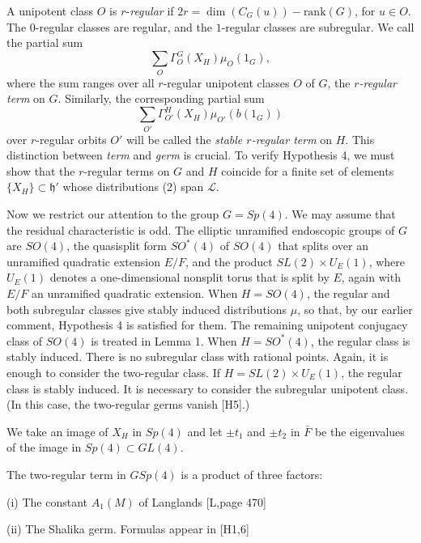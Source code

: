 \documentclass{amsart}
\newcommand\cL{{\mathcal L}}
\newcommand\h{{\mathfrak h}}
\begin{document}
A unipotent class $O$ is $r$-{\it regular} if $2r=\dim(C_G(u))-
\text{rank}(G)$, for $u\in O$.  The $0$-regular classes are 
regular, and the $1$-regular classes are subregular.
We call the partial sum 
$$\sum_O\Gamma_O^G(X_H)\mu_O(1_G),$$ where the sum ranges
over all $r$-regular unipotent classes $O$ of $G$, the
{\it $r$-regular term\/} on $G$.  Similarly, the corresponding partial
sum
$$\sum_{O'}\Gamma_{O'}^H(X_H)\mu_{O'}(b(1_G))$$
over $r$-regular orbits $O'$ will be called the
{\it stable $r$-regular term\/} on $H$.  This
distinction between {\it term\/} and {\it germ\/} is
crucial. To verify Hypothesis
4, we must show that the $r$-regular terms on $G$ and $H$
coincide for a finite set of elements $\{X_H\}\subset \h'$ whose
distributions (2) span $\cL$.

\bigskip

Now we restrict our attention to the group $G=Sp(4)$.  
We may assume that the residual characteristic is odd.
The elliptic unramified endoscopic groups
of $G$ are $SO(4)$, the quasisplit form $SO^*(4)$ of $SO(4)$ 
that splits over
an unramified quadratic extension $E/F$, and the product
$SL(2)\times U_E(1)$, where $U_E(1)$ denotes a one-dimensional
nonsplit torus that is split by $E$,
again with $E/F$ an unramified quadratic extension.
When $H=SO(4)$, the regular and both subregular classes give stably
induced distributions $\mu$, so that, by our earlier
comment, Hypothesis 4 is satisfied for
them.  The remaining unipotent conjugacy class of $SO(4)$ is treated
in Lemma 1.  When $H=SO^*(4)$, the regular class is stably
induced. There is no subregular class with
rational points. Again, it is enough to consider the two-regular
class.  If $H=SL(2)\times U_E(1)$, the regular class is
stably induced. It is necessary to consider
the subregular unipotent class.  (In this case, the two-regular
germs vanish [H5].)

We take an image of $X_H$ in $Sp(4)$
and let $\pm t_1$ and $\pm t_2$ in $\bar F$ be the eigenvalues
of the image in $Sp(4)\subset GL(4)$.

The two-regular term in $GSp(4)$
is a product of three factors:

(i)  The constant $A_1(M)$ of Langlands [L,page 470]

(ii)  The Shalika germ. Formulas appear in [H1,6]
\end{document}
